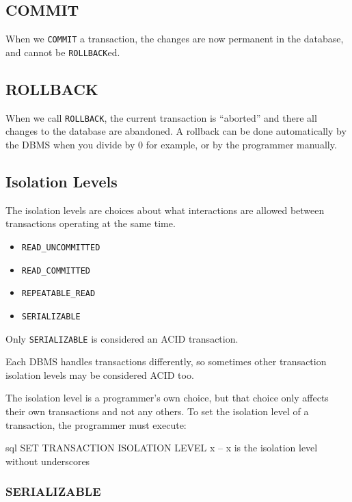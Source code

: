 \subsection{COMMIT}\label{sub:committransaction}

When we \texttt{COMMIT} a transaction, the changes are now permanent in the database, and cannot be \texttt{ROLLBACK}ed.

\subsection{ROLLBACK}\label{sub:rollbacktransaction}

When we call \texttt{ROLLBACK}, the current transaction is ``aborted'' and there all changes to the database are abandoned.
A rollback can be done automatically by the DBMS when you divide by \(0\) for example, or by the programmer manually.

\subsection{Isolation Levels}\label{sub:isolation_levels}

The isolation levels are choices about what interactions are allowed between transactions operating at the same time.
\begin{itemize}
    \item \texttt{READ_UNCOMMITTED}
    \item \texttt{READ_COMMITTED}
    \item \texttt{REPEATABLE_READ}
    \item \texttt{SERIALIZABLE}
\end{itemize}
Only \texttt{SERIALIZABLE} is considered an ACID transaction.
\begin{note}
    Each DBMS handles transactions differently, so sometimes other transaction isolation levels may be considered ACID too.
\end{note}
The isolation level is a programmer's own choice, but that choice only affects their own transactions and not any others.
To set the isolation level of a transaction, the programmer must execute:
\begin{code}{sql}
    SET TRANSACTION ISOLATION LEVEL x -- x is the isolation level without underscores
\end{code}

\subsubsection{SERIALIZABLE}\label{ssub:serializable}

